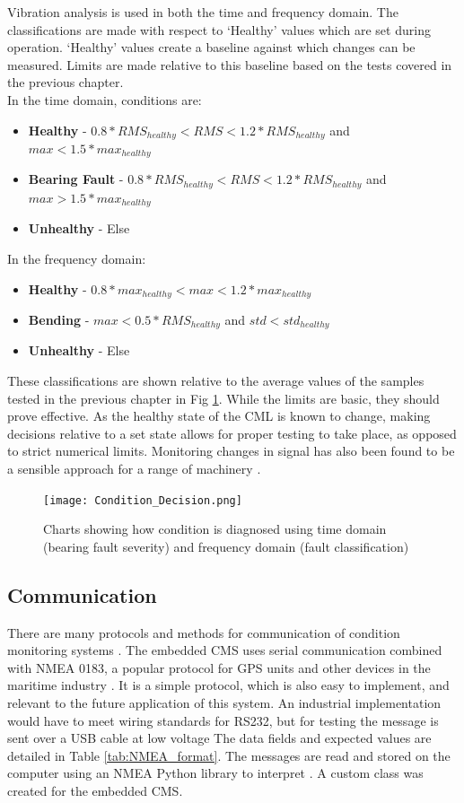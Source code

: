 Vibration analysis is used in both the time and frequency domain.
The classifications are made with respect to `Healthy' values which are set during operation.
`Healthy' values create a baseline against which changes can be measured.
Limits are made relative to this baseline based on the tests covered in the previous chapter.\\
In the time domain, conditions are:
\begin{itemize}
    \item \textbf{Healthy} - $0.8*RMS_{healthy} < RMS < 1.2*RMS_{healthy}$ and $max < 1.5*max_{healthy}$
    \item \textbf{Bearing Fault} - $0.8*RMS_{healthy} < RMS < 1.2*RMS_{healthy}$ and $max > 1.5*max_{healthy}$
    \item \textbf{Unhealthy} - Else
\end{itemize}
In the frequency domain:
\begin{itemize}
    \item \textbf{Healthy} - $0.8*max_{healthy} < max < 1.2*max_{healthy}$
    \item \textbf{Bending} - $max < 0.5*RMS_{healthy}$ and $std < std_{healthy}$
    \item \textbf{Unhealthy} - Else
\end{itemize}

These classifications are shown relative to the average values of the samples tested in the previous chapter in Fig \ref{fig:Condition_Decision}.
While the limits are basic, they should prove effective.
As the healthy state of the CML is known to change, making decisions relative to a set state allows for proper testing to take place, as opposed to strict numerical limits.
Monitoring changes in signal has also been found to be a sensible approach for a range of machinery \cite{CM_randall}.

\begin{figure}
    \centering
    \texttt{[image: Condition\_Decision.png]}
    \caption{Charts showing how condition is diagnosed using time domain (bearing fault severity) and frequency domain (fault classification)}
    \label{fig:Condition_Decision}
\end{figure}

\subsection{Communication}

There are many protocols and methods for communication of condition monitoring systems \cite{Embedded_Comms}.
The embedded CMS uses serial communication combined with NMEA 0183, a popular protocol for GPS units and other devices in the maritime industry \cite{NMEA_website}.
It is a simple protocol, which is also easy to implement, and relevant to the future application of this system.
An industrial implementation would have to meet wiring standards for RS232, but for testing the message is sent over a USB cable at low voltage \cite{NMEA_website}
The data fields and expected values are detailed in Table \ref{tab:NMEA_format}.
The messages are read and stored on the computer using an NMEA Python library to interpret \cite{PythonNmea2}.
A custom class was created for the embedded CMS.



